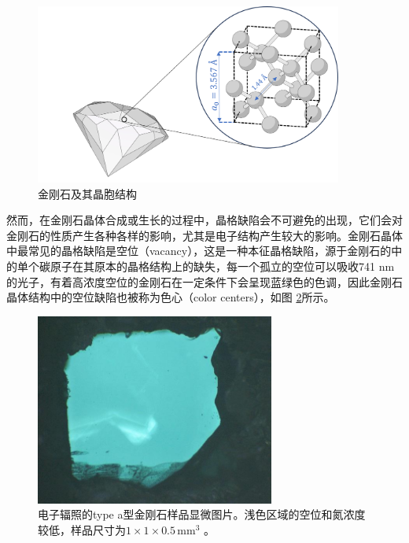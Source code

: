 \documentclass[type = bachelor]{whu-thesis}
\begin{document}
\begin{figure}[h]
  \centering
  \includegraphics[width=0.9\textwidth]{figures/Chapter 1/Diamond Lattice.png}
  \caption[金刚石及其晶胞结构]{金刚石及其晶胞结构\cite{staudacher2015nuclear}}
  \label{fig: Diamond Lattice}
\end{figure}

然而，在金刚石晶体合成或生长的过程中，晶格缺陷会不可避免的出现，它们会对金刚石的性质产生各种各样的影响，尤其是电子结构产生较大的影响\cite{jelezko2006single, nebel2003electronic}。金刚石晶体中最常见的晶格缺陷是空位（vacancy），这是一种本征晶格缺陷，源于金刚石的中的单个碳原子在其原本的晶格结构上的缺失，每一个孤立的空位可以吸收741 nm的光子，有着高浓度空位的金刚石在一定条件下会呈现蓝绿色的色调，因此金刚石晶体结构中的空位缺陷也被称为色心（color centers），如图 \ref{fig: Color Center}所示\cite{waldermann2007creating, kiflawi2007electron}。

\begin{figure}
  \centering
  \includegraphics[width=0.7\textwidth]{figures/Chapter 1/Color Center.jpg}
  \caption[电子辐照的type \uppercase\expandafter{}a型金刚石样品显微图片]{电子辐照的type \uppercase\expandafter{}a型金刚石样品显微图片。浅色区域的空位和氮浓度较低，样品尺寸为\(1\times1\times0.5 \, \mathrm{mm^3}\) \cite{kiflawi2007electron}。}
  \label{fig: Color Center}
\end{figure}
\end{document}
